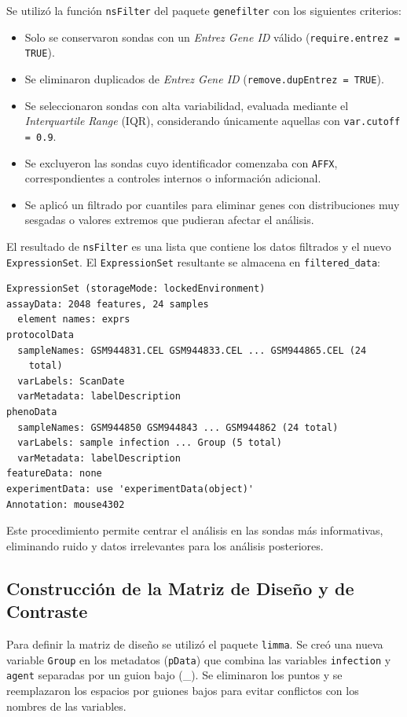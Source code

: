 \documentclass[12pt,a4paper]{article}
\begin{document}
Se utilizó la función \texttt{nsFilter} del paquete \texttt{genefilter} con los siguientes criterios:

\begin{itemize}
    \item Solo se conservaron sondas con un \textit{Entrez Gene ID} válido (\texttt{require.entrez = TRUE}).
    \item Se eliminaron duplicados de \textit{Entrez Gene ID} (\texttt{remove.dupEntrez = TRUE}).
    \item Se seleccionaron sondas con alta variabilidad, evaluada mediante el \textit{Interquartile Range} (IQR), considerando únicamente aquellas con \texttt{var.cutoff = 0.9}.
    \item Se excluyeron las sondas cuyo identificador comenzaba con \texttt{AFFX}, correspondientes a controles internos o información adicional.
    \item Se aplicó un filtrado por cuantiles para eliminar genes con distribuciones muy sesgadas o valores extremos que pudieran afectar el análisis.
\end{itemize}

El resultado de \texttt{nsFilter} es una lista que contiene los datos filtrados y el nuevo \texttt{ExpressionSet}. El \texttt{ExpressionSet} resultante se almacena en \texttt{filtered\_data}:

\begin{verbatim}
ExpressionSet (storageMode: lockedEnvironment)
assayData: 2048 features, 24 samples 
  element names: exprs 
protocolData
  sampleNames: GSM944831.CEL GSM944833.CEL ... GSM944865.CEL (24
    total)
  varLabels: ScanDate
  varMetadata: labelDescription
phenoData
  sampleNames: GSM944850 GSM944843 ... GSM944862 (24 total)
  varLabels: sample infection ... Group (5 total)
  varMetadata: labelDescription
featureData: none
experimentData: use 'experimentData(object)'
Annotation: mouse4302 
\end{verbatim}

Este procedimiento permite centrar el análisis en las sondas más informativas, eliminando ruido y datos irrelevantes para los análisis posteriores.

\subsection{Construcción de la Matriz de Diseño y de Contraste}

Para definir la matriz de diseño se utilizó el paquete \texttt{limma}. Se creó una nueva variable \texttt{Group} en los metadatos (\texttt{pData}) que combina las variables \texttt{infection} y \texttt{agent} separadas por un guion bajo (\_). Se eliminaron los puntos y se reemplazaron los espacios por guiones bajos para evitar conflictos con los nombres de las variables.
\end{document}
